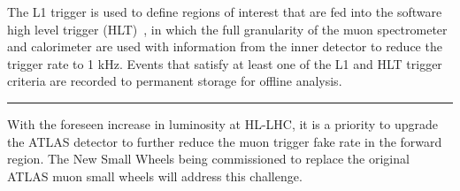 The L1 trigger is used to define regions of interest that are fed into the software high level trigger (HLT)~\cite{atlas_hlt_trigger_tdr}, in which the full granularity of the muon spectrometer and calorimeter are used with information from the inner detector to reduce the trigger rate to 1 kHz. Events that satisfy at least one of the L1 and HLT trigger criteria are recorded to permanent storage for offline analysis.

\begin{center}
  \noindent\rule[0.5ex]{0.1\linewidth}{0.5pt}
\end{center}

With the foreseen increase in luminosity at HL-LHC, it is a priority to upgrade the ATLAS detector to further reduce the muon trigger fake rate in the forward region. The New Small Wheels being commissioned to replace the original ATLAS muon small wheels will address this challenge.

